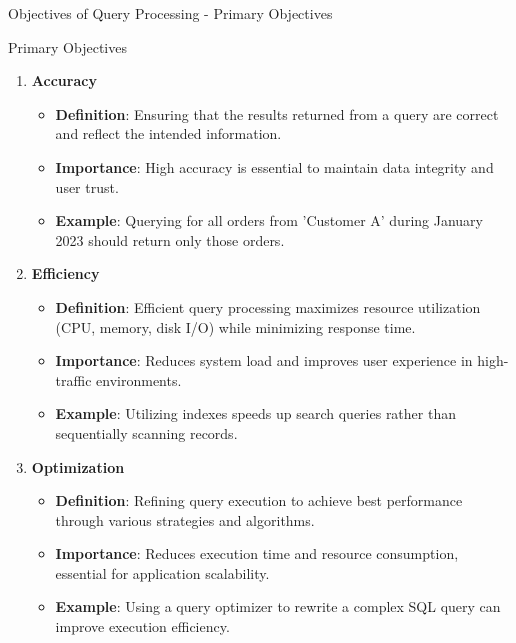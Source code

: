 \documentclass[aspectratio=169]{beamer}
\begin{document}
\begin{frame}[fragile]{Objectives of Query Processing - Primary Objectives}
    \begin{block}{Primary Objectives}
        \begin{enumerate}
            \item \textbf{Accuracy}
                \begin{itemize}
                    \item \textbf{Definition}: Ensuring that the results returned from a query are correct and reflect the intended information.
                    \item \textbf{Importance}: High accuracy is essential to maintain data integrity and user trust.
                    \item \textbf{Example}: Querying for all orders from 'Customer A' during January 2023 should return only those orders.
                \end{itemize}
                
            \item \textbf{Efficiency}
                \begin{itemize}
                    \item \textbf{Definition}: Efficient query processing maximizes resource utilization (CPU, memory, disk I/O) while minimizing response time.
                    \item \textbf{Importance}: Reduces system load and improves user experience in high-traffic environments.
                    \item \textbf{Example}: Utilizing indexes speeds up search queries rather than sequentially scanning records.
                \end{itemize}
                
            \item \textbf{Optimization}
                \begin{itemize}
                    \item \textbf{Definition}: Refining query execution to achieve best performance through various strategies and algorithms.
                    \item \textbf{Importance}: Reduces execution time and resource consumption, essential for application scalability.
                    \item \textbf{Example}: Using a query optimizer to rewrite a complex SQL query can improve execution efficiency.
                \end{itemize}
        \end{enumerate}
    \end{block}
\end{frame}
\end{document}
